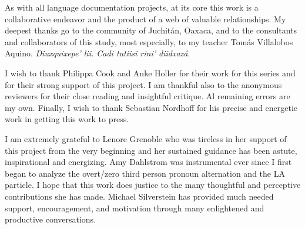 \begin{refsection}

As with all language documentation projects, at its core this work is a collaborative endeavor and the product of a web of valuable relationships. My deepest thanks go to the community of Juchit\'{a}n, Oaxaca, and to the consultants and collaborators of this study, most especially, to my teacher Tom\'{a}s Villalobos Aquino. \textit{Diuxquixepe’ lii. Cadi tutiisi rini’ diidxaz\'{a}}.

I wish to thank Philippa Cook and Anke Holler for their work for this series and for their strong support of this project. I am thankful also to the anonymous reviewers for their close reading and insightful critique. Al remaining errors are my own. Finally, I wish to thank Sebastian Nordhoff for his precise and energetic work in getting this work to press.

I am extremely grateful to Lenore Grenoble who was tireless in her support of this project from the very beginning and her sustained guidance has been astute, inspirational and energizing. Amy Dahlstrom was instrumental ever since I first began to analyze the overt/zero third person pronoun alternation and the LA particle. I hope that this work does justice to the many thoughtful and perceptive contributions she has made. Michael Silverstein has provided much needed support, encouragement, and motivation through many enlightened and productive conversations.




\end{refsection}
